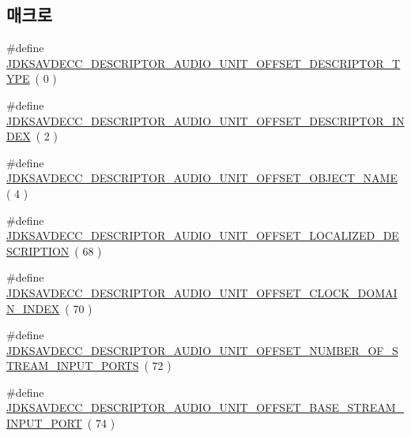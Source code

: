 \subsection*{매크로}
\begin{DoxyCompactItemize}
\item 
\#define \hyperlink{group__descriptor__audio_gafb9f530a7f30eefde653186b64929f9e}{J\+D\+K\+S\+A\+V\+D\+E\+C\+C\+\_\+\+D\+E\+S\+C\+R\+I\+P\+T\+O\+R\+\_\+\+A\+U\+D\+I\+O\+\_\+\+U\+N\+I\+T\+\_\+\+O\+F\+F\+S\+E\+T\+\_\+\+D\+E\+S\+C\+R\+I\+P\+T\+O\+R\+\_\+\+T\+Y\+PE}~( 0 )
\item 
\#define \hyperlink{group__descriptor__audio_gaedb66f23120fb33884cb96d943f87825}{J\+D\+K\+S\+A\+V\+D\+E\+C\+C\+\_\+\+D\+E\+S\+C\+R\+I\+P\+T\+O\+R\+\_\+\+A\+U\+D\+I\+O\+\_\+\+U\+N\+I\+T\+\_\+\+O\+F\+F\+S\+E\+T\+\_\+\+D\+E\+S\+C\+R\+I\+P\+T\+O\+R\+\_\+\+I\+N\+D\+EX}~( 2 )
\item 
\#define \hyperlink{group__descriptor__audio_ga760df08cb0e182a40213a858f6c2fab9}{J\+D\+K\+S\+A\+V\+D\+E\+C\+C\+\_\+\+D\+E\+S\+C\+R\+I\+P\+T\+O\+R\+\_\+\+A\+U\+D\+I\+O\+\_\+\+U\+N\+I\+T\+\_\+\+O\+F\+F\+S\+E\+T\+\_\+\+O\+B\+J\+E\+C\+T\+\_\+\+N\+A\+ME}~( 4 )
\item 
\#define \hyperlink{group__descriptor__audio_ga6c4940527dd63344548acac9113cd6f2}{J\+D\+K\+S\+A\+V\+D\+E\+C\+C\+\_\+\+D\+E\+S\+C\+R\+I\+P\+T\+O\+R\+\_\+\+A\+U\+D\+I\+O\+\_\+\+U\+N\+I\+T\+\_\+\+O\+F\+F\+S\+E\+T\+\_\+\+L\+O\+C\+A\+L\+I\+Z\+E\+D\+\_\+\+D\+E\+S\+C\+R\+I\+P\+T\+I\+ON}~( 68 )
\item 
\#define \hyperlink{group__descriptor__audio_ga7edd8dc9c064b2b3ca449ea11ba25e57}{J\+D\+K\+S\+A\+V\+D\+E\+C\+C\+\_\+\+D\+E\+S\+C\+R\+I\+P\+T\+O\+R\+\_\+\+A\+U\+D\+I\+O\+\_\+\+U\+N\+I\+T\+\_\+\+O\+F\+F\+S\+E\+T\+\_\+\+C\+L\+O\+C\+K\+\_\+\+D\+O\+M\+A\+I\+N\+\_\+\+I\+N\+D\+EX}~( 70 )
\item 
\#define \hyperlink{group__descriptor__audio_ga39091c19f847fb73e6d7b41a7d629820}{J\+D\+K\+S\+A\+V\+D\+E\+C\+C\+\_\+\+D\+E\+S\+C\+R\+I\+P\+T\+O\+R\+\_\+\+A\+U\+D\+I\+O\+\_\+\+U\+N\+I\+T\+\_\+\+O\+F\+F\+S\+E\+T\+\_\+\+N\+U\+M\+B\+E\+R\+\_\+\+O\+F\+\_\+\+S\+T\+R\+E\+A\+M\+\_\+\+I\+N\+P\+U\+T\+\_\+\+P\+O\+R\+TS}~( 72 )
\item 
\#define \hyperlink{group__descriptor__audio_ga53d52fe1afaccb7b855cd718fb0926c7}{J\+D\+K\+S\+A\+V\+D\+E\+C\+C\+\_\+\+D\+E\+S\+C\+R\+I\+P\+T\+O\+R\+\_\+\+A\+U\+D\+I\+O\+\_\+\+U\+N\+I\+T\+\_\+\+O\+F\+F\+S\+E\+T\+\_\+\+B\+A\+S\+E\+\_\+\+S\+T\+R\+E\+A\+M\+\_\+\+I\+N\+P\+U\+T\+\_\+\+P\+O\+RT}~( 74 )
\item 

\end{DoxyCompactItemize}
